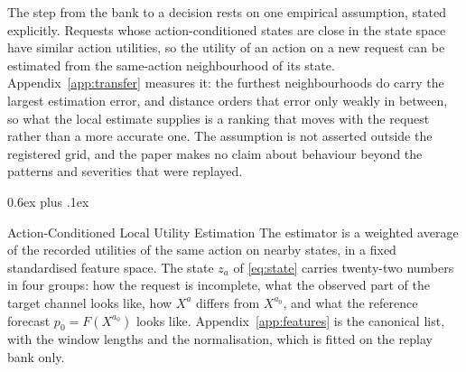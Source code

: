 \documentclass{article}
\makeatletter
\def\subsection{\@startsection{subsection}{2}{\z@}{-1.4ex plus -0.4ex minus -.2ex}%
  {0.6ex plus .1ex}{\normalsize\sc\raggedright}}
\makeatother
\begin{document}
The step from the bank to a decision rests on one empirical assumption, stated explicitly.
Requests whose action-conditioned states are close in the state space have similar action
utilities, so the utility of an action on a new request can be estimated from the same-action
neighbourhood of its state. Appendix~\ref{app:transfer} measures it: the furthest
neighbourhoods do carry the largest estimation error, and distance orders that error only
weakly in between, so what the local estimate supplies is a ranking that moves with the
request rather than a more accurate one. The assumption is not asserted outside the registered
grid, and the paper makes no claim about behaviour beyond the patterns and severities that
were replayed.

\subsection{Action-Conditioned Local Utility Estimation}
\label{sec:method-scoring}
The estimator is a weighted average of the recorded utilities of the same action on nearby
states, in a fixed standardised feature space. The state $z_a$ of \eqref{eq:state} carries
twenty-two numbers in four groups: how the request is incomplete, what the observed part of the
target channel looks like, how $X^{a}$ differs from $X^{a_0}$, and what the reference forecast
$p_0 = F(X^{a_0})$ looks like. Appendix~\ref{app:features} is the canonical list, with the
window lengths and the normalisation, which is fitted on the replay bank only.
\end{document}
